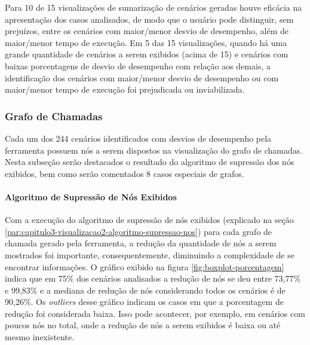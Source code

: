\begin{framed}
  \noindent Para 10 de 15 visualizações de sumarização de cenários geradas houve eficácia na apresentação dos casos analisados, de modo que o usuário pode distinguir, sem prejuízos, entre os cenários com maior/menor desvio de desempenho, além de maior/menor tempo de execução. Em 5 das 15 visualizações, quando há uma grande quantidade de cenários a serem exibidos (acima de 15) e cenários com baixas porcentagens de desvio de desempenho com relação aos demais, a identificação dos cenários com maior/menor desvio de desempenho ou com maior/menor tempo de execução foi prejudicada ou inviabilizada.
\end{framed}

\subsubsection{Grafo de Chamadas} \label{subsec:avaliacao-comportamento-grafo-chamadas}

Cada um dos 244 cenários identificados com desvios de desempenho pela ferramenta possuem nós a serem dispostos na visualização do grafo de chamadas. Nesta subseção serão destacados o resultado do algoritmo de supressão dos nós exibidos, bem como serão comentados 8 casos especiais de grafos.

\paragraph{Algoritmo de Supressão de Nós Exibidos}

Com a execução do algoritmo de supressão de nós exibidos (explicado na seção \ref{par:capitulo3-visualizacao2-algoritmo-supressao-nos}) para cada grafo de chamada gerado pela ferramenta, a redução da quantidade de nós a serem mostrados foi importante, consequentemente, diminuindo a complexidade de se encontrar informações. O gráfico exibido na figura \ref{fig:boxplot-porcentagem} indica que em 75\% dos cenários analisados a redução de nós se deu entre 73,77\% e 99,83\% e a mediana de redução de nós considerando todos os cenários é de 90,26\%. Os \textit{outliers} desse gráfico indicam os casos em que a porcentagem de redução foi considerada baixa. Isso pode acontecer, por exemplo, em cenários com poucos nós no total, onde a redução de nós a serem exibidos é baixa ou até mesmo inexistente.

